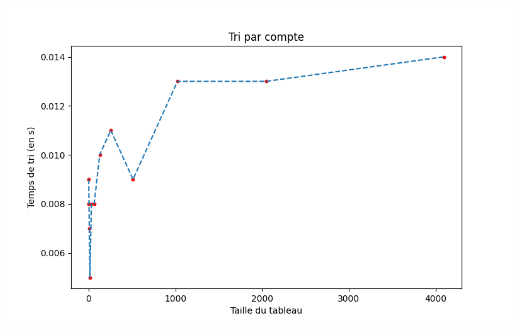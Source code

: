 \documentclass[11pt,a4paper]{article}
\begin{document}
    \includegraphics[scale = 0.7]{../Courbes/Valeurs_random_avec_répétiton/Tri par compte.png}
    
\end{document}
